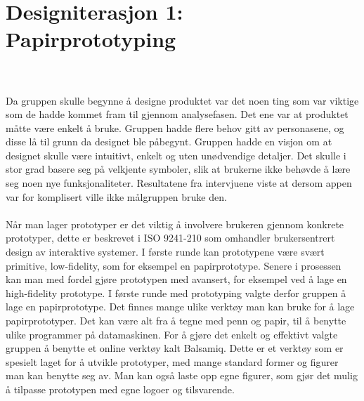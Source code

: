 \section{\textcolor[HTML]{D32F2F}{Designiterasjon 1: Papirprototyping}}
\label{design1}
\\\\
Da gruppen skulle begynne å designe produktet var det noen ting som var viktige som de hadde kommet fram til gjennom analysefasen. Det ene var at produktet måtte være enkelt å bruke. Gruppen hadde flere behov gitt av personasene, og disse lå til grunn da designet ble påbegynt. Gruppen hadde en visjon om at designet skulle være intuitivt, enkelt og uten unødvendige detaljer. Det skulle i stor grad basere seg på velkjente symboler, slik at brukerne ikke behøvde å lære seg noen nye funksjonaliteter. Resultatene fra intervjuene viste at dersom appen var for komplisert ville ikke målgruppen bruke den.
\\\\
Når man lager prototyper er det viktig å involvere brukeren gjennom konkrete prototyper\cite{brukersentrert}, dette er beskrevet i ISO 9241-210 som omhandler brukersentrert design av interaktive systemer. I første runde kan prototypene være svært primitive, low-fidelity, som for eksempel en papirprototype. Senere i prosessen kan man med fordel gjøre prototypen med avansert, for eksempel ved å lage en high-fidelity prototype\cite{paperprototype}. I første runde med prototyping valgte derfor gruppen å lage en papirprototype. Det finnes mange ulike verktøy man kan bruke for å lage papirprototyper. Det kan være alt fra å tegne med penn og papir, til å benytte ulike programmer på datamaskinen. For å gjøre det enkelt og effektivt valgte gruppen å benytte et online verktøy kalt Balsamiq. Dette er et verktøy som er spesielt laget for å utvikle prototyper, med mange standard former og figurer man kan benytte seg av. Man kan også laste opp egne figurer, som gjør det mulig å tilpasse prototypen med egne logoer og tilsvarende.\\


